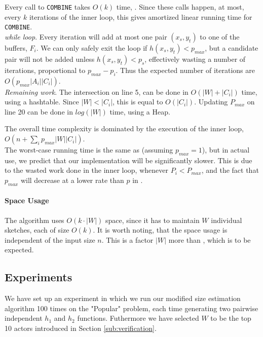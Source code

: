 \documentclass[a4paper,11pt]{article}
\begin{document}
Every call to \texttt{COMBINE} takes $O(k)$ time, \cite{paper:amossen}. Since these calls happen, at most, every $k$ iterations of the inner loop, this gives amortized linear running time for \texttt{COMBINE}.\\

\textit{while loop}. Every iteration will add at most one pair $(x_s, y_t)$ to one of the buffers, $F_i$. We can only safely exit the loop if $h(x_s, y_t) < p_{max}$, but a candidate pair will not be added unless $h(x_s, y_t) < p_s$, effectively wasting a number of iterations, proportional to $p_{max}-p_i$. Thus the expected number of iterations are $O(p_{max}|A_i||C_i|)$.\\

\textit{Remaining work}.
The intersection on line 5, can be done in $O(|W|+|C_i|)$ time, using a hashtable. Since $|W|<|C_i|$, this is equal to $O(|C_i|)$.
Updating $P_{max}$ on line 20 can be done in $log(|W|)$ time, using a Heap.

The overall time complexity is dominated by the execution of the inner loop, $O(n + \sum_i p_{max}|W||C_i|)$.\\

The worst-case running time is the same as \cite{paper:amossen} (assuming $p_{max} = 1$), but in actual use, we predict that our implementation will be significantly slower. This is due to the wasted work done in the inner loop, whenever $P_i < P_{max}$, and the fact that $p_{max}$ will decrease at a lower rate than $p$ in \cite{paper:amossen}.

\paragraph{Space Usage}
The algorithm uses $O(k\cdot|W|)$ space, since it has to maintain $W$ individual sketches, each of size $O(k)$. It is worth noting, that the space usage is independent of the input size $n$. This is a factor $|W|$ more than \cite{paper:amossen}, which is to be expected.

\subsection{Experiments}
We have set up an experiment in which we run our modified size estimation algorithm 100 times on the "Popular" problem, 
each time generating two pairwise independent $h_1$ and $h_2$ functions. 
Futhermore we have selected $W$ to be the top 10 actors introduced in Section \ref{sub:verification}. 
\end{document}
